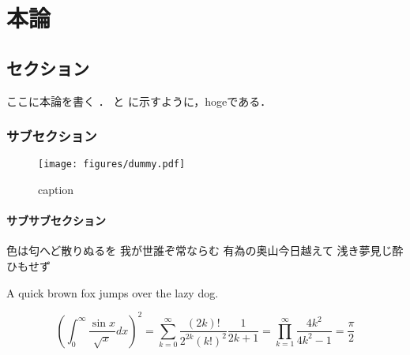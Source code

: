 \documentclass[main]{subfiles}
\begin{document}
\chapter{本論}
\section{セクション}
ここに本論を書く \cite{ref:yao2017integrated} \cite{ref:ugarte1992curling} \cite{ref:nomura2022uwb}．
と に示すように，hogeである．

\subsection{サブセクション}

\begin{figure}[htbp]
    \centering
    \texttt{[image: figures/dummy.pdf]}
    \caption{caption}
    \label{fig:label}
\end{figure}

\subsubsection{サブサブセクション}

色は匂へど散りぬるを 我が世誰ぞ常ならむ 有為の奥山今日越えて 浅き夢見じ酔ひもせず


A quick brown fox jumps over the lazy dog.


\begin{equation}
    \left( \int_{0}^\infty \frac{\sin x}{\sqrt {x}} dx \right)^{2}
    = \sum_{k = 0}^\infty \frac{(2k)!}{2^{2k}(k!)^{2}} \frac{1}{2k + 1}
    = \prod_{k = 1}^\infty \frac{4k^{2}}{4k^{2} - 1} = \frac{\pi}{2}
    \label{eq:label}
\end{equation}
\end{document}
